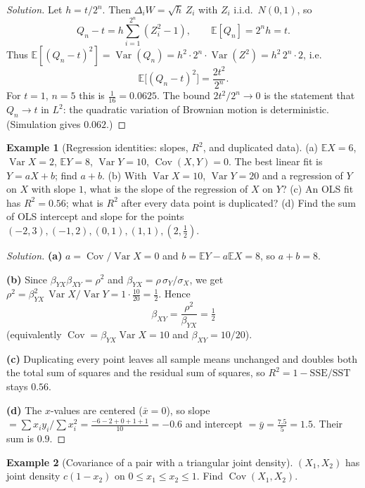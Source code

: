 \documentclass[11pt]{article}
\theoremstyle{definition}
\newtheorem{example}{Example}[section]
\newcommand{\E}{\mathbb{E}}
\newcommand{\Var}{\operatorname{Var}}
\newcommand{\Cov}{\operatorname{Cov}}
\begin{document}
\begin{proof}[Solution]
Let $h=t/2^n$. Then $\Delta_iW=\sqrt h\,Z_i$ with $Z_i$ i.i.d.\ $N(0,1)$, so
\[
Q_n-t=h\sum_{i=1}^{2^n}(Z_i^2-1),\qquad\E[Q_n]=2^nh=t.
\]
Thus $\E[(Q_n-t)^2]=\Var(Q_n)=h^2\cdot2^n\cdot\Var(Z^2)=h^2\,2^n\cdot2$, i.e.
\[
\E\bigl[(Q_n-t)^2\bigr]=\frac{2t^2}{2^n}.
\]
For $t=1$, $n=5$ this is $\boxed{\tfrac1{16}=0.0625}$. The bound $2t^2/2^n\to0$ is the statement that $Q_n\to t$ in $L^2$: the quadratic variation of Brownian motion is deterministic. (Simulation gives $0.062$.)
\end{proof}

\begin{example}[Regression identities: slopes, $R^2$, and duplicated data]
(a) $\E X=6$, $\Var X=2$, $\E Y=8$, $\Var Y=10$, $\Cov(X,Y)=0$. The best linear fit is $Y=aX+b$; find $a+b$. (b) With $\Var X=10$, $\Var Y=20$ and a regression of $Y$ on $X$ with slope $1$, what is the slope of the regression of $X$ on $Y$? (c) An OLS fit has $R^2=0.56$; what is $R^2$ after every data point is duplicated? (d) Find the sum of OLS intercept and slope for the points $(-2,3),(-1,2),(0,1),(1,1),(2,\tfrac12)$.
\end{example}

\begin{proof}[Solution]
\textbf{(a)} $a=\Cov/\Var X=0$ and $b=\E Y-a\E X=8$, so $a+b=\boxed{8}$.

\textbf{(b)} Since $\beta_{YX}\beta_{XY}=\rho^2$ and $\beta_{YX}=\rho\,\sigma_Y/\sigma_X$, we get $\rho^2=\beta_{YX}^2\,\Var X/\Var Y=1\cdot\tfrac{10}{20}=\tfrac12$. Hence
\[
\beta_{XY}=\frac{\rho^2}{\beta_{YX}}=\boxed{\tfrac12}
\]
(equivalently $\Cov=\beta_{YX}\Var X=10$ and $\beta_{XY}=10/20$).

\textbf{(c)} Duplicating every point leaves all sample means unchanged and doubles both the total sum of squares and the residual sum of squares, so $R^2=1-\mathrm{SSE}/\mathrm{SST}$ stays $\boxed{0.56}$.

\textbf{(d)} The $x$-values are centered ($\bar x=0$), so slope $=\sum x_iy_i/\sum x_i^2=\tfrac{-6-2+0+1+1}{10}=-0.6$ and intercept $=\bar y=\tfrac{7.5}5=1.5$. Their sum is $\boxed{0.9}$.
\end{proof}

\begin{example}[Covariance of a pair with a triangular joint density]
$(X_1,X_2)$ has joint density $c(1-x_2)$ on $0\le x_1\le x_2\le1$. Find $\Cov(X_1,X_2)$.
\end{example}
\end{document}
